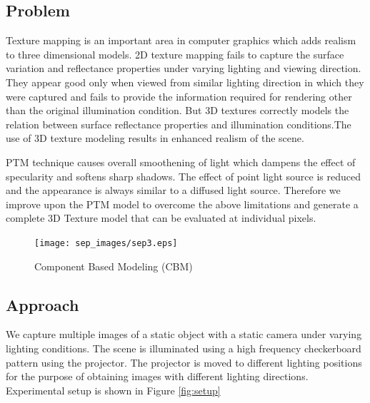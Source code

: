 \subsection{Problem}
Texture mapping is an important area in computer graphics which adds realism to three dimensional models.
2D texture mapping fails to capture the surface variation and reflectance properties under
varying lighting and viewing direction. They appear good only when viewed from similar lighting
direction in which they were captured and fails to provide the information required for rendering other than the original
illumination condition. But 3D textures correctly models the relation between surface reflectance
properties and illumination conditions.The use of 3D texture modeling
results in enhanced realism of the scene.

PTM technique causes overall smoothening of light which dampens the effect
of specularity and softens sharp shadows. The effect of point light source is
reduced and the appearance is always similar to a diffused light source.
Therefore we improve upon the PTM model 
to overcome the above limitations
and generate a complete 3D Texture model that can be evaluated at individual
pixels.  


\begin{figure}[t]
\centering
\texttt{[image: sep\_images/sep3.eps]}
\label{fig:2}
\caption{Component Based Modeling (CBM)}
\end{figure}

\subsection{Approach}
We capture multiple images of a static object with a static camera under varying
lighting conditions.
The scene is
illuminated using a high frequency checkerboard pattern using the projector. The
projector is moved to different lighting positions for the purpose of obtaining
images with different lighting directions. Experimental setup is shown in Figure \ref{fig:setup}

